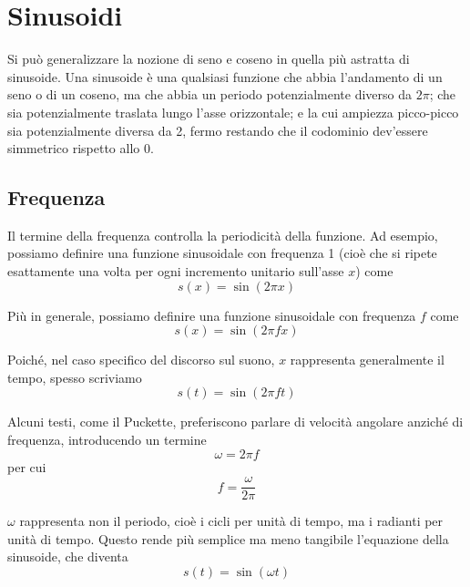 \section{Sinusoidi}

Si può generalizzare la nozione di seno e coseno in quella più astratta di sinusoide. Una sinusoide è una qualsiasi funzione che abbia l'andamento di un seno o di un coseno, ma che abbia un periodo potenzialmente diverso da $2 \pi$; che sia potenzialmente traslata lungo l'asse orizzontale; e la cui ampiezza picco-picco sia potenzialmente diversa da 2, fermo restando che il codominio dev'essere simmetrico rispetto allo 0.

\subsection{Frequenza}

Il termine della frequenza controlla la periodicità della funzione. Ad esempio, possiamo definire una funzione sinusoidale con frequenza 1 (cioè che si ripete esattamente una volta per ogni incremento unitario sull'asse $x$) come
\begin{equation}
s(x) = \sin(2 \pi x)
\end{equation}

Più in generale, possiamo definire una funzione sinusoidale con frequenza $f$ come
\begin{equation}
s(x) = \sin({2 \pi} f x)
\end{equation}

Poiché, nel caso specifico del discorso sul suono, $x$ rappresenta generalmente il tempo, spesso scriviamo
\begin{equation}
s(t) = \sin({2 \pi} f t)
\end{equation}

Alcuni testi, come il Puckette, preferiscono parlare di velocità angolare anziché di frequenza, introducendo un termine
\begin{equation}
\omega = 2 \pi f
\end{equation}
per cui
\begin{equation}
f = \frac{\omega}{2 \pi}
\end{equation}

$\omega$ rappresenta non il periodo, cioè i cicli per unità di tempo, ma i radianti per unità di tempo. Questo rende più semplice ma meno tangibile l'equazione della sinusoide, che diventa
\begin{equation}
s(t) = \sin(\omega t)
\end{equation}

